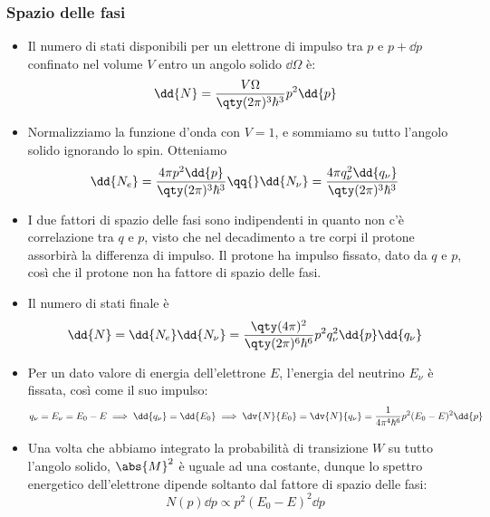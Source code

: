 \subsubsection{Spazio delle fasi}
\begin{itemize}
    \item Il numero di stati disponibili per un elettrone di impulso tra $p$ e $p+\dd{p}$ confinato nel volume $V$ entro un angolo solido $\dd{\Omega}$ è:
    \begin{equation*}
    \dd{N}=\frac{V\Omega}{\qty(2\pi)^3\hbar^3}p^2\dd{p}
    \end{equation*}
    \item Normalizziamo la funzione d'onda con $V=1$, e sommiamo su tutto l'angolo solido ignorando lo spin. Otteniamo
    \begin{equation*}
    \dd{N_e}=\frac{4\pi p^2\dd{p}}{\qty(2\pi)^3\hbar^3}\qq{}\dd{N_\nu}=\frac{4\pi q_\nu^2\dd{q_\nu}}{\qty(2\pi)^3\hbar^3} 
    \end{equation*}
    \item I due fattori di spazio delle fasi sono indipendenti in quanto non c'è correlazione tra $q$ e $p$, visto che nel decadimento a tre corpi il protone assorbirà la differenza di impulso. Il protone ha impulso fissato, dato da $q$ e $p$, così che il protone non ha fattore di spazio delle fasi.
    \item Il numero di stati finale è 
    \begin{equation*}
    \dd{N}=\dd{N_e}\dd{N_\nu}=\frac{\qty(4\pi)^2}{\qty(2\pi)^6\hbar^6}p^2q_\nu^2\dd{p}\dd{q_\nu}
    \end{equation*}
    \item Per un dato valore di energia dell'elettrone $E$, l'energia del neutrino $E_\nu$ è fissata, così come il suo impulso:
    \begin{equation*}
    q_\nu=E_\nu=E_0-E\implies\dd{q_\nu}=\dd{E_0}\implies\dv{N}{E_0}=\dv{N}{q_\nu}=\frac{1}{4\pi^4\hbar^6}p^2(E_0-E)^2\dd{p}
    \end{equation*}
    \item Una volta che abbiamo integrato la probabilità di transizione $W$ su tutto l'angolo solido, $\abs{M}^2$ è uguale ad una costante, dunque lo spettro energetico dell'elettrone dipende soltanto dal fattore di spazio delle fasi:
    \begin{equation*}
    N(p)\dd{p}\propto p^2(E_0-E)^2\dd{p}
    \end{equation*}
\end{itemize}
